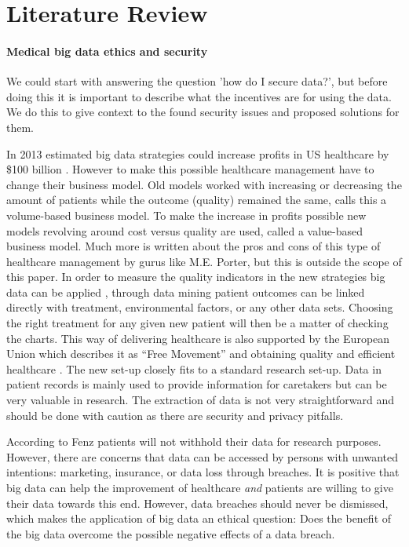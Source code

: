 \section{Literature Review}
\label{security-literature}

\paragraph{Medical big data ethics and security}
\label{security-ethics}

We could start with answering the question 'how do I secure data?', but before doing this it is important to describe what the incentives are for using the data.
We do this to give context to the found security issues and proposed solutions for them.

In 2013 \cite{s20Groves2013} estimated big data strategies could increase profits in US healthcare by \$100 billion \cite{s13Patil2014}.
However to make this possible healthcare management have to change their business model.
Old models worked with increasing or decreasing the amount of patients while the outcome (quality) remained the same, \cite{s13Patil2014} calls this a volume-based business model.
To make the increase in profits possible new models revolving around cost versus quality are used, called a value-based business model.
Much more is written about the pros and cons of this type of healthcare management by gurus like M.E. Porter, but this is outside the scope of this paper.
In order to measure the quality indicators in the new strategies big data can be applied \cite{s6West2009}, through data mining patient outcomes can be linked directly with treatment, environmental factors, or any other data sets.
Choosing the right treatment for any given new patient will then be a matter of checking the charts.
This way of delivering healthcare is also supported by the European Union which describes it as ``Free Movement'' and obtaining quality and efficient healthcare \cite{s8FernandezAleman2013}.
The new set-up closely fits to a standard research set-up.
Data in patient records is mainly used to provide information for caretakers but can be very valuable in research\cite{s15Fenz2014}.
The extraction of data is not very straightforward and should be done with caution as there are security and privacy pitfalls.

According to Fenz \cite{s15Fenz2014} patients will not withhold their data for research purposes.
However, there are concerns that data can be accessed by persons with unwanted intentions: marketing, insurance, or data loss through breaches.
It is positive that big data can help the improvement of healthcare \emph{and} patients are willing to give their data towards this end.
However, data breaches should never be dismissed, which makes the application of big data an ethical question: Does the benefit of the big data overcome the possible negative effects of a data breach.

